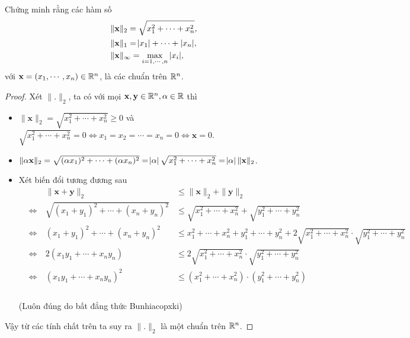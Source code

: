 \begin{exercise}{3}
    Chứng minh rằng các hàm số
    \begin{align*}
        &\|\mathbf{x}\|_2 = \sqrt{x_1^2+\cdots+x_n^2},\\
        &\|\mathbf{x}\|_1 = \abs{x_1}+\cdots+|x_n|,\\
        &\|\mathbf{x}\|_{\infty} = \max_{i = 1,\cdots,n} |x_i|,
    \end{align*}
    với $\mathbf{x} = (x_1,\cdots,x_n) \in \mathbb R^n$, là các chuẩn trên $\mathbb R^n$.
\end{exercise}

\begin{proof}
Xét $\|\mathbf{.}\|_2$, ta có với mọi $\mathbf{x}, \mathbf{y} \in \mathbb R^n, \alpha \in \mathbb R$ thì
\begin{itemize}
    \item $\|\mathbf{x}\|_2 = \sqrt{x_1^2+\cdots+x_n^2} \geq 0$
        và $\sqrt{x_1^2+\cdots+x_n^2} = 0 \Leftrightarrow x_1 = x_2 = \cdots = x_n = 0 \Leftrightarrow \mathbf{x} = 0$.
    \item $\|\mathbf{\alpha x}\|_2 = \sqrt{(\alpha x_1)^2+\cdots+(\alpha x_n)^2} = \abs{\alpha} \sqrt{x_1^2+\cdots+x_n^2} = \abs{\alpha} \|\mathbf{x}\|_2$.
    \item Xét biến đổi tương đương sau
    \begin{alignat*}{3}
        & & \|\mathbf{x} + \mathbf{y}\|_2 &\leq \|\mathbf{x}\|_2 + \|\mathbf{y}\|_2\\
        &\Leftrightarrow\ & \sqrt{(x_1+y_1)^2+\cdots+(x_n+y_n)^2} &\leq \sqrt{x_1^2+\cdots+x_n^2} + \sqrt{y_1^2+\cdots+y_n^2}\\
        &\Leftrightarrow\ & (x_1+y_1)^2+\cdots+(x_n+y_n)^2 &\leq x_1^2+\cdots+x_n^2 + y_1^2+\cdots+y_n^2 + 2\sqrt{x_1^2+\cdots+x_n^2} \cdot \sqrt{y_1^2+\cdots+y_n^2}\\
        &\Leftrightarrow\ & 2(x_1y_1+\cdots+x_ny_n) &\leq 2\sqrt{x_1^2+\cdots+x_n^2} \cdot \sqrt{y_1^2+\cdots+y_n^2}\\
        &\Leftrightarrow\ & (x_1y_1+\cdots+x_ny_n)^2 &\leq (x_1^2+\cdots+x_n^2) \cdot (y_1^2+\cdots+y_n^2)\\
    \end{alignat*}\\[-1.5cm]
        (Luôn đúng do bất đẳng thức Bunhiacopxki)
\end{itemize}
Vậy từ các tính chất trên ta suy ra $\|\mathbf{.}\|_2$ là một chuẩn trên $\mathbb R^n$.\QEDFill\nll

\end{proof}

